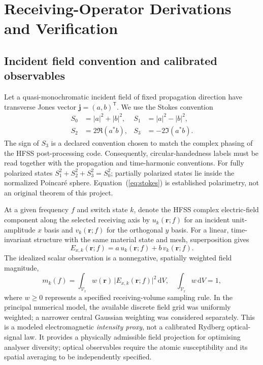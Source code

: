 \documentclass{ieeeaccess}
\newcommand{\Vroi}{\mathcal{V}_{\mathrm r}}
\begin{document}
\section{Receiving-Operator Derivations and Verification}\label{sec:derived}

\subsection{Incident field convention and calibrated observables}
Let a quasi-monochromatic incident field of fixed propagation direction have transverse Jones vector $\boldsymbol{j}=(a,b)^{\mathsf{T}}$. We use the Stokes convention
\begin{subequations}\label{eq:stokes}
\begin{align}
S_0&=|a|^2+|b|^2, & S_1&=|a|^2-|b|^2,\\
S_2&=2\Re(a^*b), & S_3&=-2\Im(a^*b).
\end{align}
\end{subequations}
The sign of $S_3$ is a declared convention chosen to match the complex phasing of the HFSS post-processing code. Consequently, circular-handedness labels must be read together with the propagation and time-harmonic conventions. For fully polarized states $S_1^2+S_2^2+S_3^2=S_0^2$; partially polarized states lie inside the normalized Poincar\'e sphere. Equation~(\ref{eq:stokes}) is established polarimetry, not an original theorem of this project.

At a given frequency $f$ and switch state $k$, denote the HFSS complex electric-field component along the selected receiving axis by $u_k(\boldsymbol{r};f)$ for an incident unit-amplitude $x$ basis and $v_k(\boldsymbol{r};f)$ for the orthogonal $y$ basis. For a linear, time-invariant structure with the same material state and mesh, superposition gives
\begin{equation}
E_{x,k}(\boldsymbol{r};f)=a\,u_k(\boldsymbol{r};f)+b\,v_k(\boldsymbol{r};f).
\label{eq:superposition}
\end{equation}
The idealized scalar observation is a nonnegative, spatially weighted field magnitude,
\begin{equation}
m_k(f)=\int_{\Vroi}w(\boldsymbol{r})\,\big|E_{x,k}(\boldsymbol{r};f)\big|^2\,\mathrm{d}V,
\quad \int_{\Vroi}w\,\mathrm{d}V=1,
\label{eq:observable}
\end{equation}
where $w\ge0$ represents a specified receiving-volume sampling rule. In the principal numerical model, the available discrete field grid was uniformly weighted; a narrower central Gaussian weighting was considered separately. This is a modeled electromagnetic \emph{intensity proxy}, not a calibrated Rydberg optical-signal law. It provides a physically admissible field projection for optimising analyser diversity; optical observables require the atomic susceptibility and its spatial averaging to be independently specified.
\end{document}
